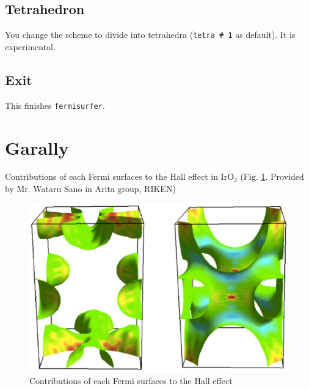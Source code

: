 \documentclass[12pt]{article}
\begin{document}
\subsection{Tetrahedron}

You change the scheme to divide into tetrahedra (\texttt{tetra \# 1} as default).
It is experimental.

\subsection{Exit}

This finishes \verb|fermisurfer|.

\section{Garally}

Contributions of each Fermi surfaces to the Hall effect
in IrO$_2$
(Fig. \ref{fig_iro2}. Provided by Mr. Wataru Sano in Arita group, RIKEN)

\begin{figure}[!ht]
  \includegraphics[width=17cm]{figs/iro2.eps}
  \caption{Contributions of each Fermi surfaces to the Hall effect}
  \label{fig_iro2}
\end{figure}
\end{document}
